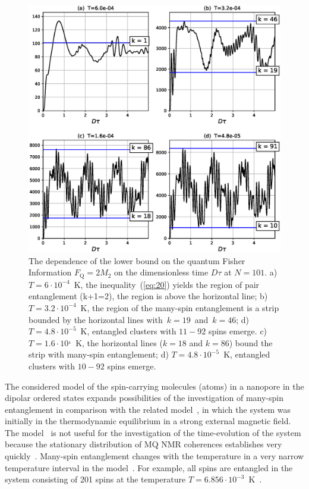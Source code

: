 \begin{figure}
  	\includegraphics[width=0.95\linewidth]{fisher_low_bound_n101.eps}
	\caption{
	    The dependence of the lower bound on the quantum Fisher Information $F_\mathrm{Q} = 2 M_{2}$
	    on the dimensionless time $D\tau$ at $N=101$.
	    a) $T=6\cdot10^{-4}$~K, the inequality~(\ref{eq:20}) yields the region of pair entanglement (k+1=2), the region is above the horizontal line;
	    b) $T=3.2\cdot10^{-4}$~K, the region of the many-spin entanglement is a strip bounded by the horizontal lines with~$k=19$~and~$k=46$;
	    d) $T=4.8\cdot10^{-5}$~K, entangled clusters with $11-92$ spins emerge.
	    c) $T = 1.6\cdot10^{_4}$~K, the horizontal lines ($k=18$ and $k=86$) bound the strip with many-spin entanglement;
	    d) $T=4.8\cdot10^{-5}$~K, entangled clusters with $10-92$ spins emerge.
	}
	\label{fig:2}
\end{figure}

The considered model of the spin-carrying molecules (atoms) in a nanopore in the dipolar ordered states expands possibilities of the investigation of many-spin entanglement in comparison with the related model~\cite{Doronin_2019},
in which the system was initially in the thermodynamic equilibrium in a strong external magnetic field.
The model~\cite{Doronin_2019}  is not useful for the investigation of the time-evolution of the system
because the stationary distribution of MQ NMR coherences establishes very quickly~\cite{Doronin_2009}.
Many-spin entanglement changes with the temperature in a very narrow temperature interval in the model~\cite{Doronin_2019}.
For example, all spins are entangled in the system consisting of 201 spins at the temperature $T=6.856\cdot10^{-3}$~K~\cite{Doronin_2019}.

